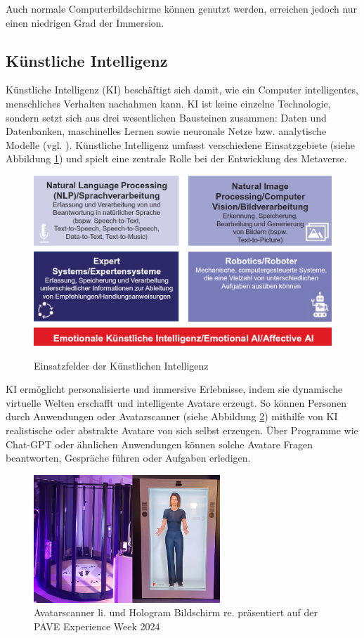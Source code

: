 Auch normale Computerbildschirme können genutzt werden, erreichen jedoch nur einen niedrigen Grad der Immersion. 

\subsection{Künstliche Intelligenz}

Künstliche Intelligenz (KI) beschäftigt sich damit, wie ein Computer intelligentes, menschliches Verhalten nachahmen kann. KI ist keine einzelne Technologie, sondern setzt sich aus drei wesentlichen Bausteinen zusammen: Daten und Datenbanken, maschinelles Lernen sowie neuronale Netze bzw. analytische Modelle (vgl. \cite{MVkompaktKI}). Künstliche Intelligenz umfasst verschiedene Einsatzgebiete (siehe Abbildung \ref*{fig:KIEInsatzfelder}) und spielt eine zentrale Rolle bei der Entwicklung des Metaverse. 

\begin{figure}[h]
    \centering
\includegraphics[width = 12cm]{figures/KIEInsatzfelder.png}
\caption{Einsatzfelder der Künstlichen Intelligenz}
\cite{KI}
\label{fig:KIEInsatzfelder}
\end{figure}

KI ermöglicht personalisierte und immersive Erlebnisse, indem sie dynamische virtuelle Welten erschafft und intelligente Avatare erzeugt. So können Personen durch Anwendungen oder Avatarscanner (siehe Abbildung \ref*{fig:ChatBotAvatar}) mithilfe von KI realistische oder abstrakte Avatare von sich selbst erzeugen. Über Programme wie Chat-GPT oder ähnlichen Anwendungen können solche Avatare Fragen beantworten, Gespräche führen oder Aufgaben erledigen.

\begin{figure}[h]
    \centering
\includegraphics[width = 7cm]{figures/holoAV.png}
\caption{Avatarscanner li. und Hologram Bildschirm re. präsentiert auf der PAVE Experience Week 2024}
\label{fig:ChatBotAvatar}
\end{figure}


